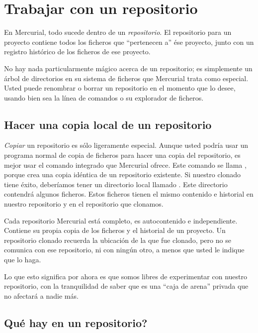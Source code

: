 \section{Trabajar con un repositorio}

En Mercurial, todo sucede dentro de un \emph{repositorio}. El
repositorio para un proyecto contiene todos los ficheros que
``pertenecen a'' ése proyecto, junto con un registro histórico de los
ficheros de ese proyecto.

No hay nada particularmente mágico acerca de un repositorio; es
simplemente un árbol de directorios en su sistema de ficheros que
Mercurial trata como especial. Usted puede renombrar o borrar un
repositorio en el momento que lo desee, usando bien sea la línea de
comandos o su explorador de ficheros.

\subsection{Hacer una copia local de un repositorio}

\emph{Copiar} un repositorio es sólo ligeramente especial. Aunque
usted podría usar un programa normal de copia de ficheros para hacer
una copia del repositorio, es mejor usar el comando integrado que
Mercurial ofrece. Este comando se llama , porque crea una copia idéntica de un
repositorio existente.
Si nuestro clonado tiene éxito, deberíamos tener un directorio local
llamado . Este directorio contendrá algunos ficheros.
Estos ficheros tienen el mismo contenido e historial en nuestro
repositorio y en el repositorio que clonamos.

Cada repositorio Mercurial está completo, es autocontenido e
independiente. Contiene su propia copia de los ficheros y el historial
de un proyecto. Un repositorio clonado recuerda la ubicación de la que
fue clonado, pero no se comunica con ese repositorio, ni con ningún
otro, a menos que usted le indique que lo haga.

Lo que esto significa por ahora es que somos libres de experimentar
con nuestro repositorio, con la tranquilidad de saber que es una
``caja de arena'' privada que no afectará a nadie más.

\subsection{Qué hay en un repositorio?}

